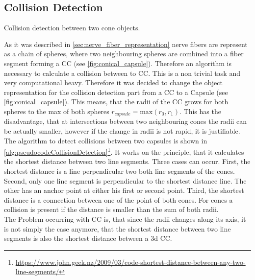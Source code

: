 \subsection{Collision Detection}
% 
\begin{lstfloat}[!t]
\caption{Collision detection between two cone objects.}
\end{lstfloat}
% 
As it was described in \cref{sec:nerve_fiber_representation} nerve fibers are represent as a chain of spheres, where two neighbouring spheres are combined into a fiber segment forming a \ac{CC} (see \cref{fig:conical_capsule}).
% 
Therefore an algorithm is necessary to calculate a collision between to \ac{CC}.
This is a non trivial task and very computational heavy.
Therefore it was decided to change the object representation for the collision detection part from a \ac{CC} to a Capsule (see \cref{fig:conical_capsule}).
This means, that the radii of the \ac{CC} grows for both spheres to the max of both spheres $r_{\mathit{capsule}} = \mathrm{max}(r_0, r_1)$.
This has the disadvantage, that at intersections between two neighbouring cones the radii can be actually smaller, however if the change in radii is not rapid, it is justifiable.
\\
The algorithm to detect collisions between two capsules is shown in \cref{alg:pseudocodeCollisionDetection}\footnote{\href{https://www.john.geek.nz/2009/03/code-shortest-distance-between-any-two-line-segments/}{https://www.john.geek.nz/2009/03/code-shortest-distance-between-any-two-line-segments/}}.
% 
It works on the principle, that it calculates the shortest distance between two line segments.
Three cases can occur.
First, the shortest distance is a line perpendicular two both line segments of the cones.
Second, only one line segment is perpendicular to the shortest distance line.
The other has an anchor point at either his first or second point.
Third, the shortest distance is a connection between one of the point of both cones.
For cones a collision is present if the distance is smaller than the sum of both radii.
\\
% 
The Problem occurring with \ac{CC} is, that since the radii changes along its axis, it is not simply the case anymore, that the shortest distance between two line segments is also the shortest distance between a 3d \ac{CC}.
% 
